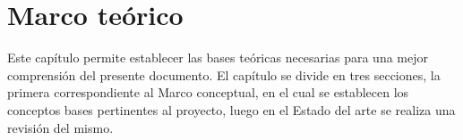 \newpage
\chapter{Marco teórico}
Este capítulo permite establecer las bases teóricas necesarias para una mejor comprensión del presente documento. El capítulo se divide en tres secciones, la primera correspondiente al Marco conceptual, en el cual se establecen los conceptos bases pertinentes al proyecto, luego en el Estado del arte se realiza una revisión del mismo.